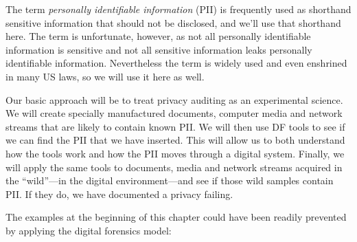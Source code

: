 The term \emph{personally identifiable
  information} (PII) is frequently used as shorthand sensitive
information that should not be disclosed, and we'll use that shorthand
here. The term is unfortunate, however, as not all personally identifiable information is
sensitive and not all sensitive information leaks personally
identifiable information. Nevertheless the term is widely used and
even enshrined in many US laws, so we will use it here as well.

Our basic approach will be to treat privacy auditing as an
experimental science. We will create specially manufactured documents,
computer media and network streams that are likely to contain known
PII. We will then use DF tools to see if we can find the PII that we
have inserted. This will allow us to both understand how the tools
work and how the PII moves through a digital system. Finally, we will
apply the same tools to documents, media and network streams acquired
in the ``wild''---in the digital environment---and see if those wild
samples contain PII. If they do, we have documented a privacy failing.

The examples at the beginning of this chapter
could have been readily prevented by applying the digital forensics
model:

